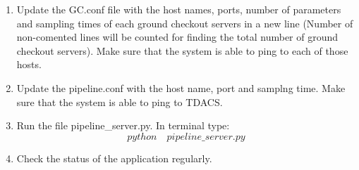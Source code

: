 \begin{enumerate}
	\item Update the GC.conf file with the host names, ports, number of
		parameters and sampling times of each ground checkout servers in a new
		line (Number of non-comented lines will be counted for finding the total
		number of ground checkout servers). Make sure that the system is able to
		ping to each of those hosts.
	\item Update the pipeline.conf with the host name, port and samplng time.
		Make sure that the system is able to ping to TDACS.
	\item Run the file pipeline\_server.py. In terminal type:
		$$python \quad pipeline\_server.py$$
	\item Check the status of the application regularly.
\end{enumerate}

